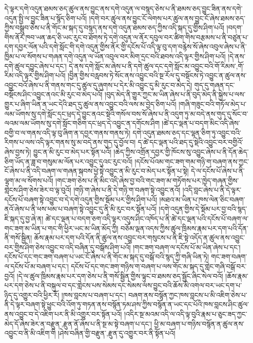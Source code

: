 དེ་ལྟར་དགེ་འདུན་ཐམས་ཅད་ཚུལ་ནས་བྱུང་ནས་དགེ་འདུན་ལ་བསྙད་ཅེས་པ་ནི་ཐམས་ཅད་བྱུང་ཟིན་ནས་དགེ་འདུན་སྤྱི་ལ་བྱུང་ཟིན་པ་སྙོད་ཅིག་པའོ། །དགེ་བར་ཚུལ་ནས་བྱུང་ངོ་ལེགས་པར་ཚུལ་ནས་བྱུང་ངོ་ཞེས་ཐམས་ཅད་ཀྱིས་བསྒྲུབ་ཅེས་པ་ནི་གོང་མ་སྐད་དུ་བསྙད་ནས་དགེ་འདུན་ཐམས་ཅད་ཀྱིས་འདི་སྐད་དུ་གྱིས་ཤིག་པའོ། །བདག་གིས་ནོར་ཁབ་ཡན་ཆད་ཅི་ཡང་རུང་བ་ཐོགས་ཏེ་དགེ་འདུན་ལ་ནོར་དབུལ་བར་ཚིག་གིས་བརྩམས་པ་ནི་བཙུན་པ་དག་དབྱར་ལོན་པའི་དགེ་སློང་གི་དགེ་འདུན་གྱིས་ནོར་གྱི་དངོས་པོ་འདི་ལྟ་བུ་དག་བརྙེས་སོ་ཞེས་འབུལ་ཞེས་པ་ནི་ཁྱིམ་པ་ལ་སོགས་པ་གཞན་དགེ་འདུན་ལ་ཡོན་འབུལ་བར་མིག་དྲང་བའི་ཐབས་འདི་ལྟར་གྱིས་ཤིག་པའོ། །དེ་ནས་དགེ་ཚུལ་དབྱུང་ཞེས་པ་དང་། དེ་ནས་དགེ་སློང་མ་ཞེས་པ་ནི་དགེ་ཚུལ་དང་དགེ་སློང་མ་འབྱུང་བའི་{གོ་རིམས་,གོ་རིམ་}འདི་ལྟར་གྱིས་ཤིག་པའོ། །བྱིན་གྱིས་བརླབས་ཏེ་སོང་ནས་འབྱུང་བའི་སྔ་རོལ་དུ་བསྡོངས་ཏེ་འབྱུང་ན་ཚུལ་ནས་འབྱུང་བའོ་ཞེས་པ་ནི་གནས་གང་དུ་ཚུལ་དུ་ཞུགས་པ་དེར་མི་འབྱུང་དུ་མི་རུང་བ་མེད་དེ། གུད་དུ་གཞན་དང་བསྡོངས་ཤིང་འབྱུང་ནའང་མི་རུང་བ་མེད་པའོ། །བུད་མེད་ནི་གྱུར་ཀྱང་མ་ཡིན་ཞེས་པ་ནི་བུད་མེད་ནི་སྐྱེས་པ་ལས་གྱུར་པ་ཞིག་ཡིན་ན་ཡང་དེའི་ཐད་དུ་ཚུལ་ནས་འབྱུང་བའི་ལས་མ་བྱེད་ཅིག་པའོ། །གཞི་གཟུང་བའི་གཏོལ་མེད་པ་ལམ་ཡོགས་སུ་དགེ་སློང་དང་ཕྲད་དེ་བྱུང་ནའང་སྡེའི་གསོལ་བས་སོ་ཞེས་པ་ནི་འདུག་ཏུ་མ་བདེ་ནས་གུད་དུ་སོང་བ་ལའམ་ལམ་ཡོགས་སུ་དགེ་སློང་གཅིག་དང་ཕྲད་དེ་འབྱུང་ན་དགོངས་ཤིག །ཚེ་དང་ལྡན་པ་བདག་མིང་འདི་ཞེས་བགྱི་བ་ལ་གནས་འདི་ལྟ་བུ་ཞིག་ན་དབྱར་གནས་གནས་ཏེ། དགེ་འདུན་ཐམས་ཅད་དང་ལྷན་ཅིག་ཏུ་འབྱུང་བའི་རིགས་པ་ལས་འདི་ལྟར་གནས་སུ་མ་བདེ་ནས་གུད་དུ་བྱོལ་བ། ད་ཚེ་དང་ལྡན་པའི་ཐད་དུ་སྡེའི་འབྱུང་བར་བགྱིའོ་ཞེས་བྱས་ཏེ། བྱུང་ན་མི་རུང་བ་མེད་པར་སྟོན་པའོ། །ཆེད་ཀྱིས་འགྲོན་དབྱར་གྱི་ཁོངས་སུ་འབྱུང་ཞེས་པ་ནི་དོན་ཆེད་ཅིག་ཡོད་ན་ཟླ་བ་གསུམ་མ་ལོན་པར་འབྱུང་དུའང་རུང་བའོ། །དངོས་པོའམ་གང་ཟག་གམ་གཉི་ག་བཞག་ནས་ཀྱང་ངོ་ཞེས་པ་ནི་འདི་བཞག་ལ་གཞན་སྐབས་ཕྱེ་སྟེ་འབྱུང་ན་མི་རུང་བ་མེད་པར་སྟོན་པ་སྟེ། དེ་ལ་དངོས་པོ་ཞེས་པ་ནི་ལྷག་མ་ལ་སོགས་པའོ། །གང་ཟག་ཅེས་པ་ནི་མིང་འདི་ཞེས་བྱ་བའི་གང་ཟག་མ་གཏོགས་པར་ཁྱེད་གཞན་གྱིས་གླེངས་ཤིག་ཅེས་ཟེར་བ་ལྟ་བུའོ། །གཉི་ག་ཞེས་པ་ནི་དེ་གཉི་ག་བཞག་སྟེ་འབྱུང་ནའོ། །འདི་བླང་ཞེས་པ་ནི་དེ་ལྟར་དངོས་པོ་བཞག་སྟེ་འབྱུང་བ་དེ་དགེ་འདུན་གྱིས་སྡོམ་པར་གྱིས་ཤིག་པའོ། །མཐའ་མ་ཡིན་པ་ཁས་ལེན་ཅིང་བཞག་ནའོ་ཞེས་པ་ནི་ཕས་ཕམ་པ་བཞག་སྟེ་འབྱུང་དུ་ནི་མི་རུང་བར་སྟོན་པའོ། །དགེ་འདུན་གྱིས་དེ་སྡོམ་པར་བྱ་བའི་སྙད་ཇི་སྐད་དུ་བྱ་ཞེ་ན། ཚེ་དང་ལྡན་པ་བདག་ཅག་འདི་ལྟར་འདུས་ཤིང་འཁོད་པ་ནི་ཚེ་དང་ལྡན་པའི་དངོས་པོ་བཞག་ལ་གང་ཟག་མ་ཡིན་པ་གང་གི་ཕྱིར་ཡང་མ་ཡིན་མོད་ཀྱི། བཅོམ་ལྡན་འདས་ཀྱིས་ཚུལ་ཁྲིམས་རྣམ་པར་དག་པའི་དོན་ནི་གསོ་སྦྱིན། ཆོས་རྣམ་པར་དག་པའི་དོན་ནི་ཚུལ་ནས་འབྱུང་བར་གསུངས་པ་ནི་ཇི་སྟེ་འདོད་ན་ཚུལ་ནས་འབྱུང་བར་གྱིས་ཤིག་ཅེས་འབྱུང་བ་འདི་བཞིན་དུ་བསྒོས་ཤིག་པའོ། །གང་ཟག་བཞག་ལ་དངོས་པོ་མ་ཡིན་ཞེས་པ་དང་། དངོས་པོ་དང་གང་ཟག་བཞག་པ་ཡང་ངོ་ཞེས་པ་ནི་གོང་མ་སྐད་དུ་བསྒོ་བའི་སྙད་ཀྱི་གཞི་ཡིན་ཏེ། གང་ཟག་བཞག་ལ་དངོས་པོ་མ་བཞག་པ་དང་། དངོས་པོ་དང་གང་ཟག་གཉིས་ག་བཞག་པ་ལས་གོང་མ་སྐད་དུ་གླེང་གཞི་བསྒོ་བར་བྱའོ། །དེ་ལ་ཚུལ་ཁྲིམས་རྣམ་པར་དག་ཅེས་པ་ནི་གསོ་སྦྱིན་གྱིས་ལྟུང་བ་ཐམས་ཅད་སྦྱོང་ཞིང་སེལ་བའོ། །ཆོས་རྣམ་པར་དག་ཅེས་པ་ནི་བསྐུལ་བ་དང་གླེངས་པས་སེམས་དང་སེམས་ལས་བྱུང་བའི་ཆོས་མི་འགལ་བར་ཡང་དག་པ་ཉིད་དུ་འགྱུར་བའི་ཕྱིར་རོ། །ཁས་བླངས་པ་བཞག་པ་དང་། བཞག་ནས་བསྙོན་ཀྱང་ཁས་བླངས་པ་མི་འཇིག་ཅེས་པ་ནི་དེ་ལྟར་བཞག་སྟེ་ཕྱུང་བའི་འོག་ཏུ་གཏན་ནས་བསྙོན་ཏམ་ཤས་ཀྱིས་བསྙོན་ན་ཡང་དང་པོའི་ཁས་བླངས་ཤིང་ཚུལ་ནས་འབྱུང་བ་དེ་འཇིག་པར་ནི་མི་འགྱུར་བར་སྟོན་པའོ། །འདིར་སྔ་མའམ་འདི་ལ་འདི་ལྟ་བུའི་རྣམ་པ་ཅུང་ཟད་ཀྱང་མེད་དོ་ཞེས་ཟེར་ན་{བརྫུན་,རྫུན་}ནོ་ཞེས་པ་ནི་སྔ་མ་སྟེ་བཞག་པ་དང་། ཕྱི་མ་བཞག་པ་གཉིས་བསྙོན་ན་ཚུལ་ནས་འབྱུང་བ་ནི་མི་འཇིག་གི །ཤེས་བཞིན་གྱི་{བརྫུན་,རྫུན་}དུ་འགྱུར་བར་ནི་སྟོན་པའོ། 